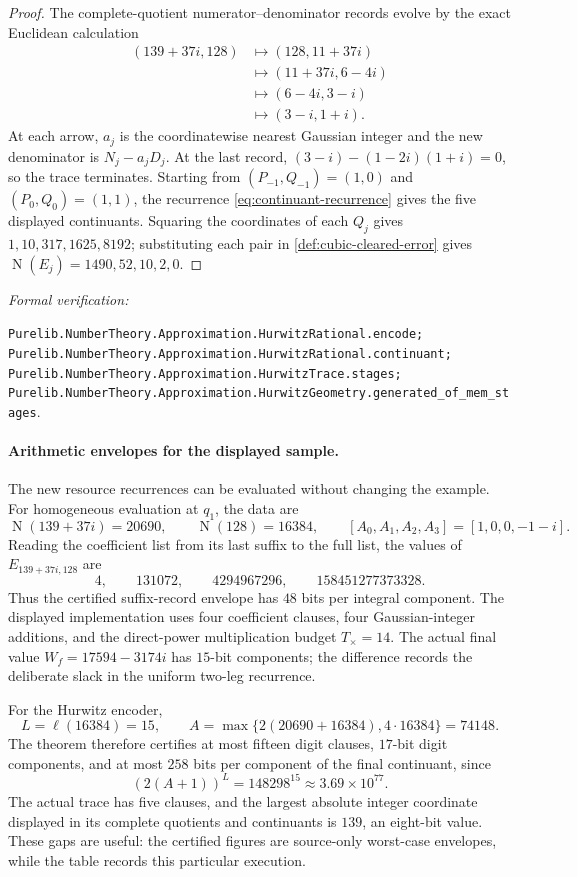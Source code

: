 \documentclass[11pt]{article}
\newcommand{\Norm}[1]{\operatorname{N}\!\left(#1\right)}
\newcommand{\leanref}[1]{\par\smallskip\noindent
  \emph{Formal verification:}\par\nobreak
  {\raggedright\nolinkurl{#1}.\par}}
\begin{document}
\begin{proof}
The complete-quotient numerator--denominator records evolve by the exact
Euclidean calculation
\[
 \begin{aligned}
 (139+37i,128)&\longmapsto(128,11+37i)\\
 &\longmapsto(11+37i,6-4i)\\
 &\longmapsto(6-4i,3-i)\\
 &\longmapsto(3-i,1+i).
 \end{aligned}
\]
At each arrow, $a_j$ is the coordinatewise nearest Gaussian integer and the
new denominator is $N_j-a_jD_j$.  At the last record,
$(3-i)-(1-2i)(1+i)=0$, so the trace terminates.  Starting from
$(P_{-1},Q_{-1})=(1,0)$ and $(P_0,Q_0)=(1,1)$, the recurrence
\eqref{eq:continuant-recurrence} gives the five displayed continuants.
Squaring the coordinates of each $Q_j$ gives
$1,10,317,1625,8192$; substituting each pair in
\cref{def:cubic-cleared-error} gives
$\Norm{E_j}=1490,52,10,2,0$.
\end{proof}

\leanref{Purelib.NumberTheory.Approximation.HurwitzRational.encode;
Purelib.NumberTheory.Approximation.HurwitzRational.continuant;
Purelib.NumberTheory.Approximation.HurwitzTrace.stages;
Purelib.NumberTheory.Approximation.HurwitzGeometry.generated_of_mem_stages}

\paragraph{Arithmetic envelopes for the displayed sample.}
The new resource recurrences can be evaluated without changing the example.
For homogeneous evaluation at $q_1$, the data are
\[
 \Norm{139+37i}=20690,\qquad \Norm{128}=16384,\qquad
 [A_0,A_1,A_2,A_3]=[1,0,0,-1-i].
\]
Reading the coefficient list from its last suffix to the full list, the
values of $E_{139+37i,128}$ are
\[
 4,\qquad 131072,\qquad 4294967296,\qquad
 158451277373328.
\]
Thus the certified suffix-record envelope has $48$ bits per integral
component.  The displayed implementation uses four coefficient clauses,
four Gaussian-integer additions, and the direct-power multiplication budget
$T_{\times}=14$.  The actual final value
$W_f=17594-3174i$ has $15$-bit components; the difference records the
deliberate slack in the uniform two-leg recurrence.

For the Hurwitz encoder,
\[
 L=\ell(16384)=15,\qquad
 A=\max\{2(20690+16384),4\cdot16384\}=74148.
\]
The theorem therefore certifies at most fifteen digit clauses, $17$-bit
digit components, and at most $258$ bits per component of the final
continuant, since
\[
 (2(A+1))^L=148298^{15}
 \approx3.69\mathbin{\times}10^{77}.
\]
The actual trace has five clauses, and the largest absolute integer
coordinate displayed in its complete quotients and continuants is $139$, an
eight-bit value.  These gaps are useful: the certified figures are
source-only worst-case envelopes, while the table records this particular
execution.
\end{document}
